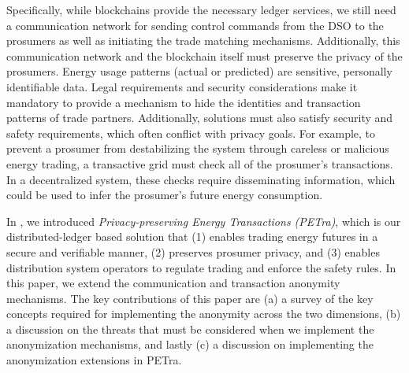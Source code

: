 Specifically, while blockchains provide the necessary ledger services, we still need a  communication network for sending control commands from the DSO to the prosumers as well as initiating the trade matching mechanisms.
Additionally, this communication network and the blockchain itself must preserve the privacy of the prosumers. Energy usage patterns (actual or predicted) are sensitive, personally identifiable data. Legal requirements and security considerations make it mandatory to provide a mechanism to hide the identities and transaction patterns of trade partners. Additionally, solutions must also satisfy security and safety requirements, which often conflict with privacy goals. For example, to prevent a prosumer from destabilizing the system through careless or malicious energy trading, a transactive grid must check all of the prosumer's transactions. In a decentralized system, these checks require disseminating information, which could be used to infer the prosumer's future energy consumption. 


In \cite{Laszka17}, we introduced {\it Privacy-preserving Energy Transactions
(PETra)}, which is our distributed-ledger based solution that
(1) enables trading energy futures in a secure and verifiable
manner, (2) preserves prosumer privacy, and (3) enables distribution system operators to regulate trading and enforce the safety rules. In this paper, we  extend the communication and transaction anonymity mechanisms. The key contributions of this paper are (a) a survey of the key concepts required for implementing the anonymity across the two dimensions, (b) a discussion on the threats that must be considered when we implement the anonymization mechanisms, and lastly (c) a discussion on implementing the anonymization extensions in PETra. 

